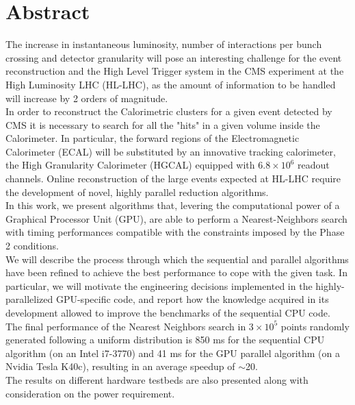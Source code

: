 \chapter*{Abstract}
\thispagestyle{empty}
The increase in instantaneous luminosity, number of interactions per bunch crossing and detector granularity will pose an interesting challenge for the event reconstruction and the High Level Trigger system in the CMS experiment at the High Luminosity LHC (HL-LHC), as the amount of information to be handled will increase by 2 orders of magnitude.\\
In order to reconstruct the Calorimetric clusters for a given event detected by CMS it is necessary to search for all the "hits" in a given volume inside the Calorimeter. In particular, the forward regions of the Electromagnetic Calorimeter (ECAL) will be substituted by an innovative tracking calorimeter, the High Granularity Calorimeter (HGCAL) equipped with $6.8\times10^6$ readout channels. Online reconstruction of the large events expected at HL-LHC require the development of novel, highly parallel reduction algorithms.\\
In this work, we present algorithms that,  levering the computational power of a Graphical Processor Unit (GPU), are able to perform a Nearest-Neighbors search with timing performances compatible with the constraints imposed by the Phase 2 conditions.\\
We will describe the process through which the sequential and parallel algorithms have been refined to achieve the best performance to cope with the given task. In particular, we will motivate the engineering decisions implemented in the highly-parallelized GPU-specific code, and report how the knowledge acquired in its development allowed to improve the benchmarks of the sequential CPU code.\\
The final performance of the Nearest Neighbors search in $3\times10^5$ points randomly generated following a uniform distribution is 850 ms for the sequential CPU algorithm (on an Intel i7-3770) and  41 ms for the GPU parallel algorithm (on a Nvidia Tesla K40c), resulting in an average speedup of $\sim$20.\\
The results on different hardware testbeds are also presented along with consideration on the power requirement.\\

\cleardoublepage

\indici
